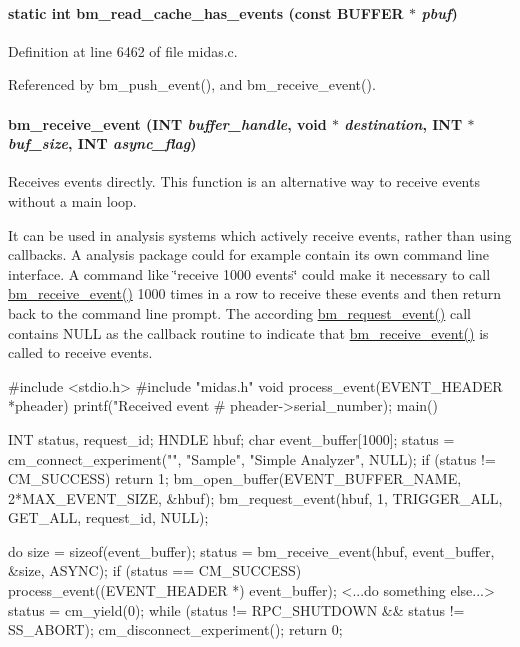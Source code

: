 \paragraph[{bm\_\-read\_\-cache\_\-has\_\-events}]{\setlength{\rightskip}{0pt plus 5cm}static int bm\_\-read\_\-cache\_\-has\_\-events (const {\bf BUFFER} $\ast$ {\em pbuf})}\hfill\label{group__bmfunctionc_gae01d28bceec73613c01f4fad2b461c83}


Definition at line 6462 of file midas.c.

Referenced by bm\_\-push\_\-event(), and bm\_\-receive\_\-event().
\paragraph[{bm\_\-receive\_\-event}]{ bm\_\-receive\_\-event ({\bf INT} {\em buffer\_\-handle}, \/  void $\ast$ {\em destination}, \/  {\bf INT} $\ast$ {\em buf\_\-size}, \/  {\bf INT} {\em async\_\-flag})}\hfill\label{group__bmfunctionc_ga2fd8bb52ad5282be3ce076e84bc007fa}
Receives events directly. This function is an alternative way to receive events without a main loop.

It can be used in analysis systems which actively receive events, rather than using callbacks. A analysis package could for example contain its own command line interface. A command like \char`\"{}receive 1000 events\char`\"{} could make it necessary to call \hyperlink{group__bmfunctionc_ga2fd8bb52ad5282be3ce076e84bc007fa}{bm\_\-receive\_\-event()} 1000 times in a row to receive these events and then return back to the command line prompt. The according \hyperlink{group__bmfunctionc_gabf663d96482aeede1846487a7ada8184}{bm\_\-request\_\-event()} call contains NULL as the callback routine to indicate that \hyperlink{group__bmfunctionc_ga2fd8bb52ad5282be3ce076e84bc007fa}{bm\_\-receive\_\-event()} is called to receive events. 
\begin{DoxyCode}
#include <stdio.h>
#include "midas.h"
void process_event(EVENT_HEADER *pheader)
{
 printf("Received event #%
 pheader->serial_number);
}
main()
{
  INT status, request_id;
  HNDLE hbuf;
  char event_buffer[1000];
  status = cm_connect_experiment("", "Sample",
  "Simple Analyzer", NULL);
  if (status != CM_SUCCESS)
   return 1;
  bm_open_buffer(EVENT_BUFFER_NAME, 2*MAX_EVENT_SIZE, &hbuf);
  bm_request_event(hbuf, 1, TRIGGER_ALL, GET_ALL, request_id, NULL);

  do
  {
   size = sizeof(event_buffer);
   status = bm_receive_event(hbuf, event_buffer, &size, ASYNC);
  if (status == CM_SUCCESS)
   process_event((EVENT_HEADER *) event_buffer);
   <...do something else...>
   status = cm_yield(0);
  } while (status != RPC_SHUTDOWN &&
  status != SS_ABORT);
  cm_disconnect_experiment();
  return 0;
}
\end{DoxyCode}
 
